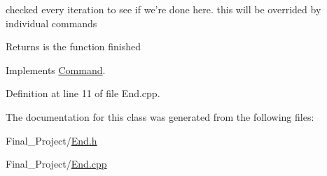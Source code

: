 checked every iteration to see if we're done here. this will be overrided by individual commands 

\begin{DoxyReturn}{Returns}
is the function finished 
\end{DoxyReturn}


Implements \hyperlink{classCommand_a9aa704d5f9d98f510a79e645701dc72a}{Command}.



Definition at line 11 of file End.\-cpp.



The documentation for this class was generated from the following files\-:\begin{DoxyCompactItemize}
\item 
Final\-\_\-\-Project/\hyperlink{End_8h}{End.\-h}\item 
Final\-\_\-\-Project/\hyperlink{End_8cpp}{End.\-cpp}\end{DoxyCompactItemize}
